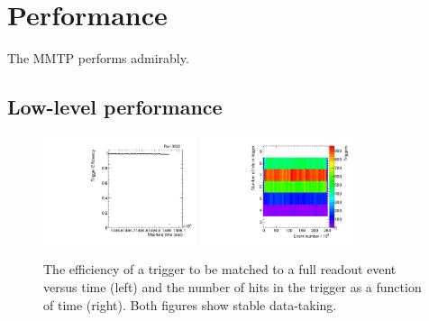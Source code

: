 \section{Performance}
\label{sec:perf}

The MMTP performs admirably.

\subsection{Low-level performance}
\label{sec:perf-simple}

\begin{figure}[!htpb]
  \begin{center}
    \includegraphics[width=0.4\textwidth]{figures/gbtanalysis3522/tpeff.pdf}
    \includegraphics[width=0.4\textwidth]{figures/tuna_analysis/trigger_hits_vs_event.pdf}
  \end{center}
  \vspace{-10pt}
  \caption{The efficiency of a trigger to be matched to a full readout event versus time (left) and the number of hits in the trigger as a function of time (right). Both figures show stable data-taking.}
  \label{fig:lowlevel}
\end{figure}

